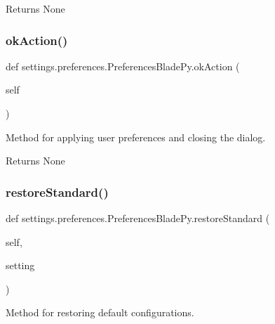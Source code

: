 \begin{DoxyReturn}{Returns}
None 
\end{DoxyReturn}
\hypertarget{classsettings_1_1preferences_1_1_preferences_blade_py_a7e99113696fefa62dfdeb2ba1279350c}{}\label{classsettings_1_1preferences_1_1_preferences_blade_py_a7e99113696fefa62dfdeb2ba1279350c} 
\subsubsection{\texorpdfstring{ok\+Action()}{okAction()}}
{\footnotesize\ttfamily def settings.\+preferences.\+Preferences\+Blade\+Py.\+ok\+Action (\begin{DoxyParamCaption}\item[{}]{self }\end{DoxyParamCaption})}



Method for applying user preferences and closing the dialog. 

\begin{DoxyReturn}{Returns}
None 
\end{DoxyReturn}
\hypertarget{classsettings_1_1preferences_1_1_preferences_blade_py_ab74be9049535f502252efb2df560ac8e}{}\label{classsettings_1_1preferences_1_1_preferences_blade_py_ab74be9049535f502252efb2df560ac8e} 
\subsubsection{\texorpdfstring{restore\+Standard()}{restoreStandard()}}
{\footnotesize\ttfamily def settings.\+preferences.\+Preferences\+Blade\+Py.\+restore\+Standard (\begin{DoxyParamCaption}\item[{}]{self,  }\item[{}]{setting }\end{DoxyParamCaption})}



Method for restoring default configurations. 


